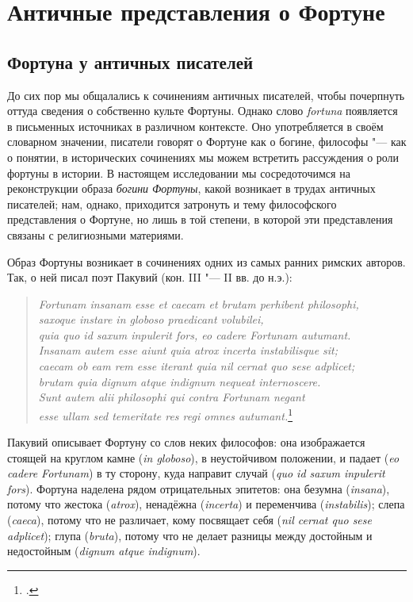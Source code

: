 \chapter{Античные представления о Фортуне}

\section{Фортуна у античных писателей}\label{Scriptores}

До сих пор мы общалались к сочинениям античных писателей, чтобы почерпнуть оттуда сведения о собственно культе Фортуны. Однако слово \textit{fortuna} появляется в письменных источниках в различном контексте. Оно употребляется в своём словарном значении, писатели говорят о Фортуне как о богине, философы "--- как о понятии, в исторических сочинениях мы можем встретить рассуждения о роли фортуны в истории. В настоящем исследовании мы сосредоточимся на реконструкции образа \textit{богини Фортуны}, какой возникает в трудах античных писателей; нам, однако, приходится затронуть и тему философского представления о Фортуне, но лишь в той степени, в которой эти представления связаны с религиозными материями.

Образ Фортуны возникает в сочинениях одних из самых ранних римских авторов. Так, о ней писал поэт Пакувий (кон. III "--- II вв. до н.э.):

\begin{verse}
\textit{Fortunam insanam esse et caecam et brutam perhibent philosophi,\\
saxoque instare in globoso praedicant volubilei,\\
quia quo id saxum inpulerit fors, eo cadere Fortunam autumant.\\
Insanam autem esse aiunt quia atrox incerta instabilisque sit;\\
caecam ob eam rem esse iterant quia nil cernat quo sese adplicet;\\
brutam quia dignum atque indignum nequeat internoscere.\\
Sunt autem alii philosophi qui contra Fortunam negant\\
esse ullam sed temeritate res regi omnes autumant.}\footcite[P. 318]{RemainsofLatin1935}
\end{verse}

Пакувий описывает Фортуну со слов неких философов: она изображается стоящей на круглом камне (\textit{in globoso}), в неустойчивом положении, и падает (\textit{eo cadere Fortunam}) в ту сторону, куда направит случай (\textit{quo id saxum inpulerit fors}). Фортуна наделена рядом отрицательных эпитетов: она безумна (\textit{insana}), потому что жестока (\textit{atrox}), ненадёжна (\textit{incerta}) и переменчива (\textit{instabilis}); слепа (\textit{caeca}), потому что не различает, кому посвящает себя (\textit{nil cernat quo sese adplicet}); глупа (\textit{bruta}), потому что не делает разницы между достойным и недостойным (\textit{dignum atque indignum}). 

